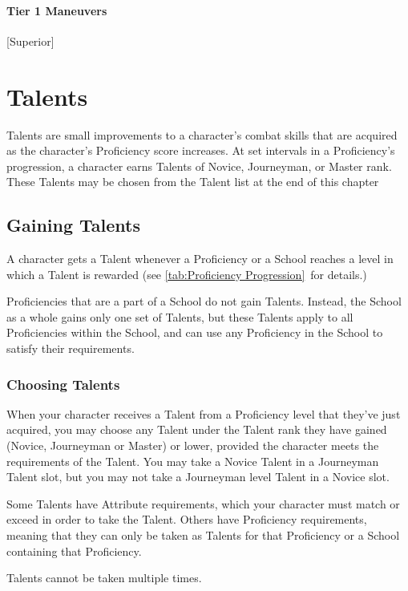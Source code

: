 \documentclass[oneside,11pt,english]{book}
\begin{document}
\subsubsection{Tier 1 Maneuvers}
 [Superior]

\chapter{Talents}\label{ch:Talents} %
\startcontents[chapters]
\clearpage
Talents are small improvements to a character’s combat skills that are acquired as the character’s Proficiency score increases. At set intervals in a Proficiency’s progression, a character earns Talents of Novice, Journeyman, or Master rank. These Talents may be chosen from the Talent list at the end of this chapter

\section{Gaining Talents}
A character gets a Talent whenever a Proficiency or a School reaches a level in which a Talent is 
rewarded (see \autoref{tab:Proficiency Progression}~for details.)

Proficiencies that are a part of a School do not gain Talents. Instead, the School as a whole gains only one 
set of Talents, but these Talents apply to all Proficiencies within the School, and can use any Proficiency 
in the School to satisfy their requirements. 

\subsection{Choosing Talents}
When your character receives a Talent from a Proficiency level that they’ve just
acquired, you may choose any Talent under the Talent rank they have gained
(Novice, Journeyman or Master) or lower, provided the character meets the
requirements of the Talent. You may take a Novice Talent in a Journeyman Talent
slot, but you may not take a Journeyman level Talent in a Novice slot. 

Some Talents have Attribute requirements, which your character must match or
exceed in order to take the Talent. Others have Proficiency requirements,
meaning that they can only be taken as Talents for that Proficiency or a School
containing that Proficiency. 

Talents cannot be taken multiple times.
\end{document}
